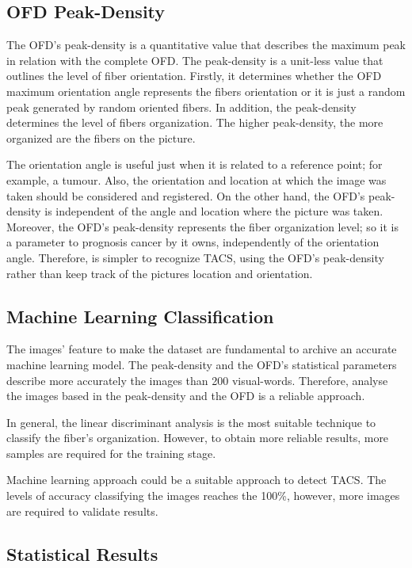\documentclass[12pt,a4paper]{article}
\begin{document}
\subsection{OFD Peak-Density}

The OFD's peak-density is a quantitative value that describes the maximum peak in relation with the complete OFD. The peak-density is a unit-less value that outlines the level of fiber orientation. Firstly, it determines whether the  OFD maximum orientation angle represents the fibers orientation or it is just a random peak generated by random oriented fibers. In addition, the peak-density determines the level of fibers organization. The higher peak-density, the more organized are the fibers on the picture. 
 
The orientation angle is useful just when it is related to a reference point; for example, a tumour. Also, the orientation and location at which the image was taken should be considered and registered. On the other hand, the OFD's peak-density is independent of the angle and location where the picture was taken. Moreover, the OFD's peak-density represents the fiber organization level; so it is a parameter to prognosis cancer by it owns, independently of the orientation angle. Therefore, is simpler to recognize TACS, using the OFD's peak-density rather than keep track of the pictures location and orientation. 

\subsection{Machine Learning Classification}

The images' feature to make the dataset are  fundamental to archive an accurate machine learning model. The peak-density and the OFD's statistical parameters describe more accurately the images than  200  visual-words. Therefore, analyse the images based in the peak-density and the OFD is a reliable approach.

In general, the linear discriminant analysis is the most suitable technique to classify the fiber's organization. However, to obtain more reliable results, more samples are required for the training stage.

Machine learning approach could be a suitable approach to detect TACS. The levels of accuracy classifying the images reaches the 100\%, however, more images are required to validate results.

\subsection{Statistical Results}
\end{document}
